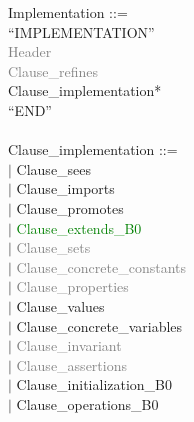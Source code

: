 \documentclass[12pt,a4paper,draft]{report}
\begin{document}
\small{
\begin{sloppypar} 
\noindent Implementation ::=\\
\hspace*{0.20in} ``IMPLEMENTATION''\\
\hspace*{0.20in} \textcolor{gray}{Header}\\
\hspace*{0.20in} \textcolor{gray}{Clause\_refines}\\
\hspace*{0.20in} Clause\_implementation*\\
\hspace*{0.20in} ``END'' \\
\\
Clause\_implementation ::=\\
\hspace*{0.20in} $|$ {Clause\_sees}\\
\hspace*{0.20in} $|$ {Clause\_imports}\\
\hspace*{0.20in} $|$ {Clause\_promotes}\\
\hspace*{0.20in} $|$ \textcolor{green}{Clause\_extends\_B0}\\
\hspace*{0.20in} $|$ \textcolor{gray}{Clause\_sets}\\
\hspace*{0.20in} $|$ \textcolor{gray}{Clause\_concrete\_constants}\\
\hspace*{0.20in} $|$ \textcolor{gray}{Clause\_properties}\\
\hspace*{0.20in} $|$ Clause\_values\\
\hspace*{0.20in} $|$ Clause\_concrete\_variables\\
\hspace*{0.20in} $|$ \textcolor{gray}{Clause\_invariant}\\
\hspace*{0.20in} $|$ \textcolor{gray}{Clause\_assertions}\\
\hspace*{0.20in} $|$ Clause\_initialization\_B0\\
\hspace*{0.20in} $|$ Clause\_operations\_B0\\
\end{sloppypar}}
\end{document}
